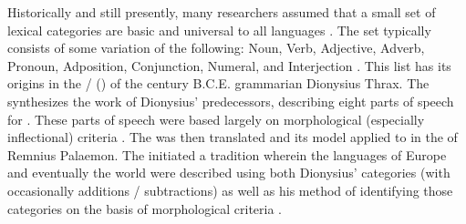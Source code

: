 Historically and still presently, many researchers assumed that a small set of lexical categories are basic and universal to all languages \parencites[81]{BolingerSears1981}[2]{Croft1991}[32]{Payne1997}[95]{Stassen2011}. The set typically consists of some variation of the following: Noun, Verb, Adjective, Adverb, Pronoun, Adposition, Conjunction, Numeral, and Interjection \parencite[16538]{Haspelmath2001}. This list has its origins in the  /  () of the  century B.C.E. grammarian Dionysius Thrax. The  synthesizes the work of Dionysius' predecessors, describing eight parts of speech for . These parts of speech were based largely on morphological (especially inflectional) criteria \parencite[17--20]{Rauh2010}. The  was then translated and its model applied to  in the  of Remnius Palaemon. The  initiated a tradition wherein the languages of Europe and eventually the world  were described using both Dionysius' categories (with occasionally additions / subtractions) as well as his method of identifying those categories on the basis of morphological criteria \parencite[20]{Rauh2010}.

